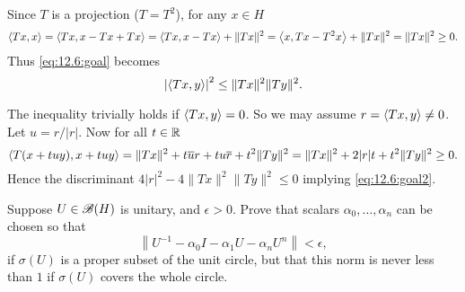\begin{enumerate}
Since $T$ is a projection (\(T=T^2\)), for any \(x\in H\)
\begin{equation*}
\left\langle Tx,x \right\rangle
= \left\langle Tx,x - Tx + Tx \right\rangle 
= \left\langle Tx,x - Tx \right\rangle + \|Tx\|^2
= \left\langle x,Tx - T^2x \right\rangle + \|Tx\|^2
= \|Tx\|^2 \geq 0.
\end{equation*}
Thus \eqref{eq:12.6:goal} becomes
\begin{equation} \label{eq:12.6:goal2}
\left|\left\langle Tx,y \right\rangle\right|^2 \leq \|Tx\|^2\|Ty\|^2.
\end{equation}

The inequality trivially holds if \(\left\langle Tx,y \right\rangle = 0\).
So we may assume \(r=\left\langle Tx,y \right\rangle \neq 0\).
Let \(u = r/|r|\).
Now for all \(t\in \mathbb{R}\)
\begin{equation*}
\left\langle T(x+tuy),x+tuy \right\rangle
= \|Tx\|^2 + t\overline{u}r + tu\overline{r} + t^2\|Ty\|^2
= \|Tx\|^2 + 2|r|t + t^2\|Ty\|^2
\geq 0.
\end{equation*}
Hence the discriminant \(4|r|^2 -4 \|Tx\|^2\|Ty\|^2 \leq 0\)
implying \eqref{eq:12.6:goal2}.

\begin{excopy}
Suppose \( U \in \mathscr{B}(H)\) is unitary,
and \(\epsilon > 0\). Prove that scalars \(\alpha_0,\ldots,\alpha_n\)
can be chosen so that
\begin{equation*}
\left\|U^{-1} - \alpha_0 I - \alpha_1 U - \alpha_n U^n\right\| < \epsilon,
\end{equation*}
if \(\sigma(U)\) is a proper subset of the unit circle,
but that this norm is never less than $1$ if
\(\sigma(U)\) covers the whole circle.
\end{excopy}
\unfinished

\begin{excopy}
\end{excopy}
\unfinished

\end{enumerate}



